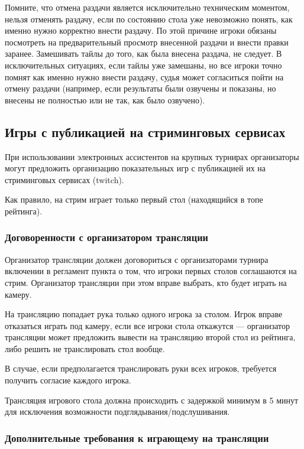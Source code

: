 Помните, что отмена раздачи является исключительно техническим моментом, нельзя отменять раздачу, если по состоянию стола уже невозможно понять, как именно нужно корректно внести раздачу. По этой причине игроки обязаны посмотреть на предварительный просмотр внесенной раздачи и внести правки заранее. Замешивать тайлы до того, как была внесена раздача, не следует. В исключительных ситуациях, если тайлы уже замешаны, но все игроки точно помнят как именно нужно внести раздачу, судья может согласиться пойти на отмену раздачи (например, если результаты были озвучены и показаны, но внесены не полностью или не так, как было озвучено).

\subsection{Игры с публикацией на стриминговых сервисах}

При использовании электронных ассистентов на крупных турнирах организаторы могут предложить организацию показательных игр с публикацией их на стриминговых сервисах (twitch).

Как правило, на стрим играет только первый стол (находящийся в топе рейтинга).

\subsubsection{Договоренности с организатором трансляции}

Организатор трансляции должен договориться с организаторами турнира включении в регламент пункта о том, что игроки первых столов соглашаются на стрим. Организатор трансляции при этом вправе выбрать, кто будет играть на камеру.

На трансляцию попадает рука только одного игрока за столом. Игрок вправе отказаться играть под камеру, если все игроки стола откажутся --- организатор трансляции может предложить вывести на трансляцию второй стол из рейтинга, либо решить не транслировать стол вообще.

В случае, если предполагается транслировать руки всех игроков, требуется получить согласие каждого игрока.

Трансляция игрового стола должна происходить с задержкой минимум в 5 минут для исключения возможности подглядывания/подслушивания.

\subsubsection{Дополнительные требования к играющему на трансляции}

